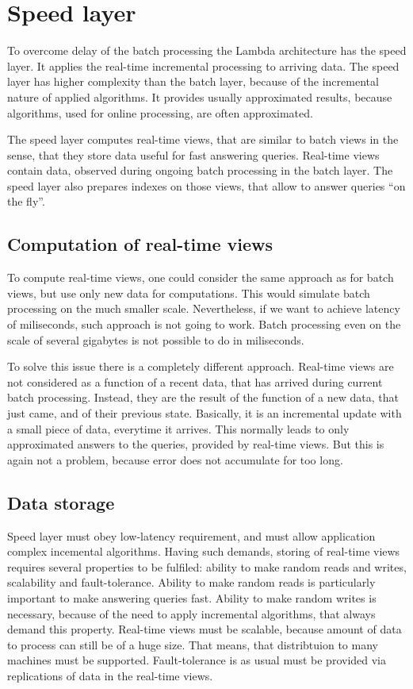 \section{Speed layer}

To overcome delay of the batch processing the Lambda architecture has the speed layer.
It applies the real-time incremental processing to arriving data.
The speed layer has higher complexity than the batch layer, because of the incremental nature of applied algorithms.
It provides usually approximated results, because algorithms, used for online processing, are often approximated.

The speed layer computes real-time views, that are similar to batch views in the sense, that they store data useful for fast answering queries.
Real-time views contain data, observed during ongoing batch processing in the batch layer.
The speed layer also prepares indexes on those views, that allow to answer queries ``on the fly''.

\subsection{Computation of real-time views}

To compute real-time views, one could consider the same approach as for batch views, but use only new data for computations.
This would simulate batch processing on the much smaller scale.
Nevertheless, if we want to achieve latency of miliseconds, such approach is not going to work.
Batch processing even on the scale of several gigabytes is not possible to do in miliseconds.

To solve this issue there is a completely different approach.
Real-time views are not considered as a function of a recent data, that has arrived during current batch processing.
Instead, they are the result of the function of a new data, that just came, and of their previous state.
Basically, it is an incremental update with a small piece of data, everytime it arrives.
This normally leads to only approximated answers to the queries, provided by real-time views.
But this is again not a problem, because error does not accumulate for too long.

\subsection{Data storage}

Speed layer must obey low-latency requirement, and must allow application complex incemental algorithms.
Having such demands, storing of real-time views requires several properties to be fulfiled: ability to make random reads and writes, scalability and fault-tolerance.
Ability to make random reads is particularly important to make answering queries fast.
Ability to make random writes is necessary, because of the need to apply incremental algorithms, that always demand this property.
Real-time views must be scalable, because amount of data to process can still be of a huge size.
That means, that distribtuion to many machines must be supported.
Fault-tolerance is as usual must be provided via replications of data in the real-time views.

